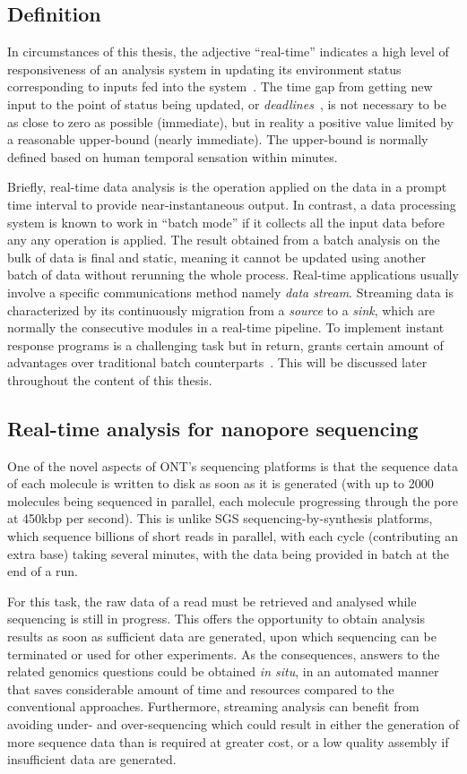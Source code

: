\subsection{Definition}
In circumstances of this thesis, the adjective ``real-time'' indicates  a high level of responsiveness of an analysis system in updating its environment status corresponding to inputs fed into the system~\cite{Phillips1966programming}.
The time gap from getting new input to the point of status being updated, or \emph{deadlines}~\cite{Ben2006principles}, is not necessary to be as close to zero as possible (immediate), but in reality a positive value limited by a reasonable upper-bound (nearly immediate).
The upper-bound is normally defined based on human temporal sensation \EG{} within minutes.

Briefly, real-time data analysis is the operation applied on the data in a prompt time interval to provide near-instantaneous output.
In contrast, a data processing system is known to work in ``batch mode'' if it collects all the input data before any any operation is applied. 
The result obtained from a batch analysis on the bulk of data is final and static, meaning it cannot be updated using another batch of data without rerunning the whole process.
Real-time applications usually involve a specific communications method namely \emph{data stream}. Streaming data is characterized by its continuously migration from a \emph{source} to a \emph{sink}, which are normally the consecutive modules in a real-time pipeline.
To implement instant response programs is a challenging task but in return, grants certain amount of advantages over traditional batch counterparts~\cite{Croushore2011frontiers}. 
This will be discussed later throughout the content of this thesis.
\subsection{Real-time analysis for nanopore sequencing}
One of the novel aspects of ONT's sequencing platforms is that the sequence data of each molecule is written to disk as soon as it is generated (with up to 2000 molecules being sequenced in parallel, each molecule progressing through the pore at 450kbp per second).    This is unlike SGS sequencing-by-synthesis platforms, which sequence billions of short reads in parallel, with each cycle (contributing an extra base) taking several minutes, with the data being provided in batch at the end of a run.

For this task, the raw data of a read must be retrieved and analysed while sequencing is still in progress. This offers the opportunity to obtain analysis results as soon as sufficient data are generated, upon which sequencing can be terminated or used for other experiments.
As the consequences, answers to the related genomics questions could be obtained \emph{in situ}, in an automated manner that saves considerable amount of time and resources compared to the conventional approaches.
Furthermore, streaming analysis can benefit from avoiding under- and over-sequencing which could result in either the generation of more sequence data than is required at greater cost, or a low quality assembly if insufficient data are generated. 

